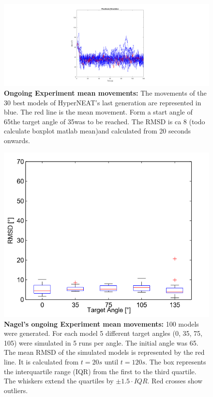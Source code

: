 \begin{figure}[tb]
	\centering
	\includegraphics[width=0.7\linewidth]{figures/OngoingModel/meanMovement35deg}
	\caption[Ongoing Experiment mean movements]{\textbf{Ongoing Experiment mean movements:} The movements of the 30 best models of HyperNEAT's last generation are represented in blue. The red line is the mean movement. Form a start angle of 65\degree  the target angle of 35\degree was to be reached. The RMSD is ca 8 (todo calculate boxplot matlab mean)\degree and calculated from 20 seconds onwards. }
	\label{fig:meanmovement35deg}
\end{figure}

\begin{figure}[tb]
	\centering
	\includegraphics[width=0.7\linewidth]{figures/OngoingModel/NagelOngoingBoxPlot}
	\caption[Nagel's ongoing Experiment mean movements]{\textbf{Nagel's ongoing Experiment mean movements:} 100 models were generated. For each model 5 different target angles (0\degree, 35\degree, 75\degree, 105\degree) were simulated in 5 runs per angle. The initial angle was 65\degree.  The mean RMSD of the simulated models is represented by the red line. It is calculated from $t=20s$ until $t=120s$. The box represents the interquartile range (IQR) from the first to the third quartile. The whiskers extend the quartiles by $\pm1.5\cdot IQR$. Red crosses show outliers. \cite{sebastianMasterThesis} }
	\label{fig:NagelOngoingBoxPlot}
\end{figure}

